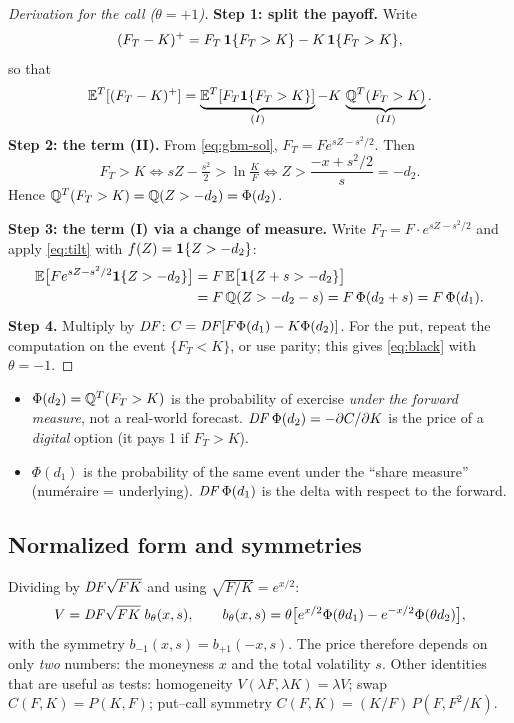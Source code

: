\begin{proof}[Derivation for the call ($\theta=+1$)]
\textbf{Step 1: split the payoff.} Write
\[
(F_T-K)^+=F_T\,\mathbf{1}\{F_T>K\}-K\,\mathbf{1}\{F_T>K\},
\]
so that
\[
\mathbb{E}^T[(F_T-K)^+]=\underbrace{\mathbb{E}^T[F_T\mathbf{1}\{F_T>K\}]}_{(I)}-K\,\underbrace{\mathbb{Q}^T(F_T>K)}_{(II)} .
\]
\textbf{Step 2: the term (II).} From \eqref{eq:gbm-sol}, $F_T=F e^{sZ-s^2/2}$. Then
\[
F_T>K\iff sZ-\tfrac{s^2}{2}>\ln\tfrac KF\iff Z>\frac{-x+s^2/2}{s}=-d_2 .
\]
Hence $\mathbb{Q}^T(F_T>K)=\mathbb{Q}(Z>-d_2)=\Phi(d_2)$.

\textbf{Step 3: the term (I) via a change of measure.} Write $F_T=F\cdot e^{sZ-s^2/2}$ and apply \eqref{eq:tilt}
with $f(Z)=\mathbf{1}\{Z>-d_2\}$:
\begin{align*}
\mathbb{E}\big[Fe^{sZ-s^2/2}\mathbf{1}\{Z>-d_2\}\big]&=F\,\mathbb{E}\big[\mathbf{1}\{Z+s>-d_2\}\big]\\
&=F\,\mathbb{Q}(Z>-d_2-s)=F\,\Phi(d_2+s)=F\,\Phi(d_1).
\end{align*}
\textbf{Step 4.} Multiply by $\mathit{DF}$: $C=\mathit{DF}[F\Phi(d_1)-K\Phi(d_2)]$. For the put, repeat the computation on the event
$\{F_T<K\}$, or use parity; this gives \eqref{eq:black} with $\theta=-1$.
\end{proof}

\begin{idea}[title={What $\Phi(d_1)$ and $\Phi(d_2)$ are}]
\begin{itemize}
\item $\Phi(d_2)=\mathbb{Q}^T(F_T>K)$ is the probability of exercise \emph{under the forward measure}, not a real-world
forecast. $\mathit{DF}\,\Phi(d_2)=-\partial C/\partial K$ is the price of a \emph{digital} option (it pays 1 if $F_T>K$).
\item $\Phi(d_1)$ is the probability of the same event under the ``share measure'' (numéraire = underlying).
$\mathit{DF}\,\Phi(d_1)$ is the delta with respect to the forward.
\end{itemize}
\end{idea}

\subsection{Normalized form and symmetries}
Dividing by $\mathit{DF}\sqrt{FK}$ and using $\sqrt{F/K}=e^{x/2}$:
\begin{equation}\label{eq:black-norm}
V=\mathit{DF}\sqrt{FK}\;b_\theta(x,s),\qquad b_\theta(x,s)=\theta\big[e^{x/2}\Phi(\theta d_1)-e^{-x/2}\Phi(\theta d_2)\big],
\end{equation}
with the symmetry $b_{-1}(x,s)=b_{+1}(-x,s)$.
The price therefore depends on only \emph{two} numbers: the moneyness $x$ and the total volatility $s$. Other
identities that are useful as tests: homogeneity $V(\lambda F,\lambda K)=\lambda V$; swap $C(F,K)=P(K,F)$; put--call symmetry
$C(F,K)=(K/F)\,P(F,F^2/K)$.

